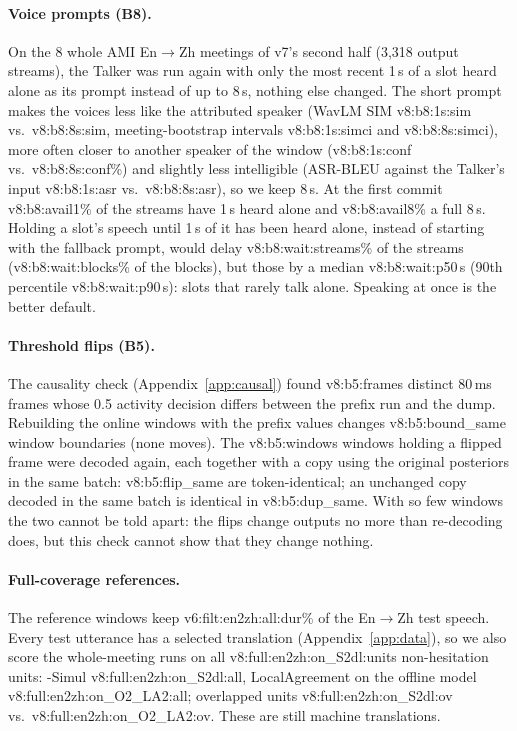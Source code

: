 \paragraph{Voice prompts (B8).} On the 8 whole AMI En$\rightarrow$Zh meetings of v7's second half (3{,}318 output
streams), the Talker was run again with only the most recent 1\,s of a slot heard alone as its prompt instead of up to
8\,s, nothing else changed. The short prompt makes the voices less like the attributed speaker (WavLM SIM
\num{v8:b8:1s:sim} vs.\ \num{v8:b8:8s:sim}, meeting-bootstrap intervals \num{v8:b8:1s:simci} and \num{v8:b8:8s:simci}),
more often closer to another speaker of the window (\num{v8:b8:1s:conf} vs.\ \num{v8:b8:8s:conf}\%) and slightly less
intelligible (ASR-BLEU against the Talker's input \num{v8:b8:1s:asr} vs.\ \num{v8:b8:8s:asr}), so we keep 8\,s. At the
first commit \num{v8:b8:avail1}\% of the streams have 1\,s heard alone and \num{v8:b8:avail8}\% a full 8\,s. Holding a
slot's speech until 1\,s of it has been heard alone, instead of starting with the fallback prompt, would delay
\num{v8:b8:wait:streams}\% of the streams (\num{v8:b8:wait:blocks}\% of the blocks), but those by a median
\num{v8:b8:wait:p50}\,s (90th percentile \num{v8:b8:wait:p90}\,s): slots that rarely talk alone. Speaking at once is the
better default.

\paragraph{Threshold flips (B5).} The causality check (Appendix~\ref{app:causal}) found \num{v8:b5:frames} distinct
80\,ms frames whose 0.5 activity decision differs between the prefix run and the dump. Rebuilding the online windows
with the prefix values changes \num{v8:b5:bound_same} window boundaries (none moves). The \num{v8:b5:windows} windows
holding a flipped frame were decoded again, each together with a copy using the original posteriors in the same batch:
\num{v8:b5:flip_same} are token-identical; an unchanged copy decoded in the same batch is identical in
\num{v8:b5:dup_same}. With so few windows the two cannot be told apart: the flips change outputs no more than
re-decoding does, but this check cannot show that they change nothing.

\paragraph{Full-coverage references.} The reference windows keep \num{v6:filt:en2zh:all:dur}\% of the En$\rightarrow$Zh
test speech. Every test utterance has a selected translation (Appendix~\ref{app:data}), so we also score the whole-meeting
runs on all \num{v8:full:en2zh:on_S2dl:units} non-hesitation units: \sys{}-Simul \num{v8:full:en2zh:on_S2dl:all}, LocalAgreement
on the offline model \num{v8:full:en2zh:on_O2_LA2:all}; overlapped units \num{v8:full:en2zh:on_S2dl:ov} vs.\
\num{v8:full:en2zh:on_O2_LA2:ov}. These are still machine translations.
